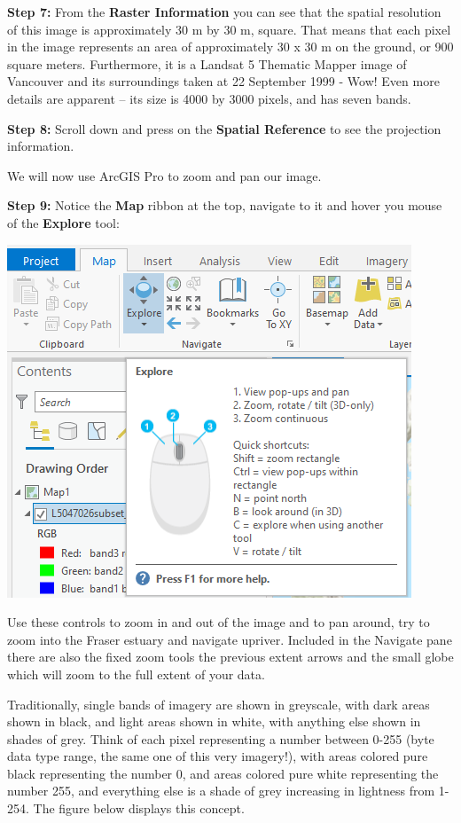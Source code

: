 \documentclass[
]{book}
\begin{document}
\textbf{Step 7:} From the \textbf{Raster Information} you can see that the spatial resolution of this image is approximately 30 m by 30 m, square. That means that each pixel in the image represents an area of approximately 30 x 30 m on the ground, or 900 square meters. Furthermore, it is a Landsat 5 Thematic Mapper image of Vancouver and its surroundings taken at 22 September 1999 - Wow! Even more details are apparent -- its size is 4000 by 3000 pixels, and has seven bands.

\textbf{Step 8:} Scroll down and press on the \textbf{Spatial Reference} to see the projection information.

We will now use ArcGIS Pro to zoom and pan our image.

\textbf{Step 9:} Notice the \textbf{Map} ribbon at the top, navigate to it and hover you mouse of the \textbf{Explore} tool:

\begin{center}\includegraphics[width=0.5\linewidth]{images/01-explore-tool} \end{center}

Use these controls to zoom in and out of the image and to pan around, try to zoom into the Fraser estuary and navigate upriver. Included in the Navigate pane there are also the fixed zoom tools the previous extent arrows and the small globe which will zoom to the full extent of your data.

Traditionally, single bands of imagery are shown in greyscale, with dark areas shown in black, and light areas shown in white, with anything else shown in shades of grey. Think of each pixel representing a number between 0-255 (byte data type range, the same one of this very imagery!), with areas colored pure black representing the number 0, and areas colored pure white representing the number 255, and everything else is a shade of grey increasing in lightness from 1-254. The figure below displays this concept.
\end{document}
